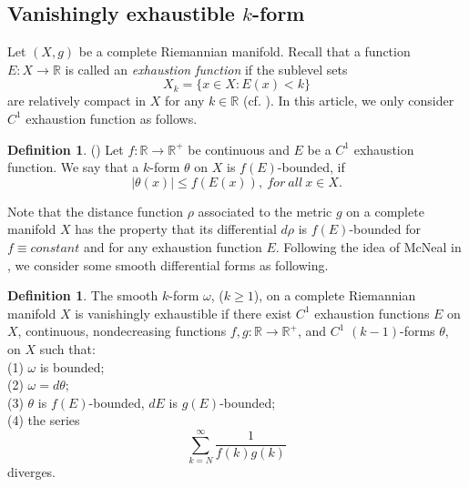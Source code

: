 \documentclass[12pt, twoside]{article}
\theoremstyle{definition}
\newtheorem{definition}[theorem]{Definition}
\numberwithin{equation}{section}
\def\w {\omega}
\begin{document}
	\subsection{Vanishingly exhaustible $k$-form}

	Let $(X,g)$ be a complete Riemannian manifold. Recall that a function $E:X\rightarrow\mathbb{R}$ is called an \textit{exhaustion function} if the sublevel sets
	$$X_{k}=\{x\in X:E(x)<k \}$$
	are relatively compact in $X$ for any $k\in\mathbb{R}$ (cf. \cite{McN03}). In this article, we only consider $C^{1}$ exhaustion function as follows.
	\begin{definition}(\cite[Definition 1]{McN03})
		Let $f:\mathbb{R}\rightarrow\mathbb{R}^{+}$ be continuous and $E$ be a $C^{1}$ exhaustion function. We say that a $k$-form $\theta$ on $X$ is $f(E)$-bounded, if
		$$|\theta(x)|\leq f(E(x)),\ for\ all\ x\in X.$$
	\end{definition}
	Note that the distance function $\rho$ associated to the metric $g$ on a complete manifold $X$ has the property that its differential $d\rho$ is $f(E)$-bounded for $f\equiv\textit{constant}$ and for any exhaustion function $E$. Following the idea of McNeal in \cite{McN03}, we consider some smooth differential forms as following.
	\begin{definition}
	The smooth  $k$-form $\w$, ($k\geq1$), on a complete Riemannian manifold $X$ is vanishingly exhaustible if there exist 
	 $C^{1}$ exhaustion functions $E$ on $X$, continuous, nondecreasing functions $f,g:\mathbb{R}\rightarrow\mathbb{R}^{+}$, 
	 and $C^{1}$ $(k-1)$-forms $\theta$,  on $X$ such that:\\
	 (1) $\w$ is bounded;\\
	 (2) $\w=d\theta$;\\
	(3) $\theta$ is $f(E)$-bounded, $dE$ is $g(E)$-bounded;\\
	(4) the series $$\sum_{k=N}^{\infty}\frac{1}{f(k)g(k)}$$ diverges.
	\end{definition}
\end{document}
